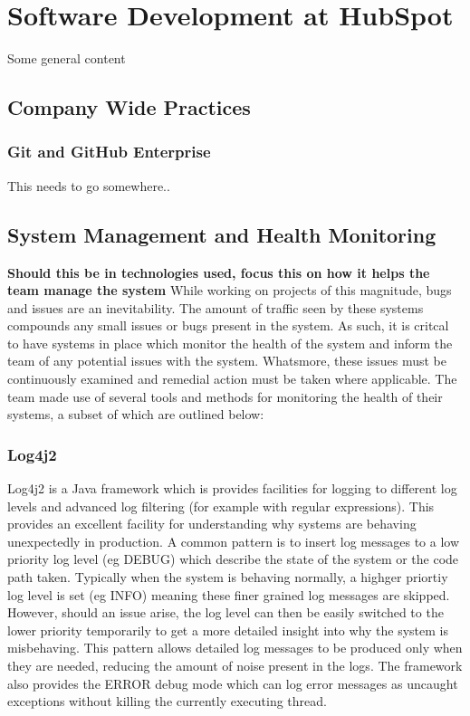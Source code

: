 \chapter{Software Development at HubSpot}
Some general content

\section{Company Wide Practices}

\subsection{Git and GitHub Enterprise}
This needs to go somewhere..

\section{System Management and Health Monitoring}
\textbf{Should this be in technologies used, focus this on how it helps the team manage the system}
While working on projects of this magnitude, bugs and issues are an inevitability. The amount of traffic seen by these systems compounds any small issues or bugs present in the system. As such, it is critcal to have systems in place which monitor the health of the system and inform the team of any potential issues with the system. Whatsmore, these issues must be continuously examined and remedial action must be taken where applicable. The \team{} team made use of several tools and methods for monitoring the health of their systems, a subset of which are outlined below:

\subsection{Log4j2\cite{log4j2}}
Log4j2 is a Java framework which is provides facilities for logging to different log levels and advanced log filtering (for example with regular expressions). This provides an excellent facility for understanding why systems are behaving unexpectedly in production. A common pattern is to insert log messages to a low priority log level (eg DEBUG) which describe the state of the system or the code path taken. Typically when the system is behaving normally, a highger priortiy log level is set (eg INFO) meaning these finer grained log messages are skipped. However, should an issue arise, the log level can then be easily switched to the lower priority temporarily to get a more detailed insight into why the system is misbehaving. This pattern allows detailed log messages to be produced only when they are needed, reducing the amount of noise present in the logs. The framework also provides the ERROR debug mode which can log error messages as uncaught exceptions without killing the currently executing thread.

